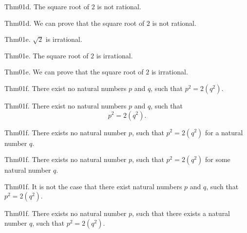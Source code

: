 \documentclass{article}
\begin{document}
Thm01d. The square root of $2$ is not rational.

Thm01d. We can prove that the square root of $2$ is not rational.

Thm01e. $\sqrt{ 2}$ is irrational.

Thm01e. The square root of $2$ is irrational.

Thm01e. We can prove that the square root of $2$ is irrational.

Thm01f. There exist no natural numbers $p$ and $q$, such that $p ^{ 2}= 2 (q ^{ 2})$.

Thm01f. There exist no natural numbers $p$ and $q$, such that $$p ^{ 2}= 2 (q ^{ 2}).$$

Thm01f. There exists no natural number $p$, such that $p ^{ 2}= 2 (q ^{ 2})$ for a natural number $q$.

Thm01f. There exists no natural number $p$, such that $p ^{ 2}= 2 (q ^{ 2})$ for some natural number $q$.

Thm01f. It is not the case that there exist natural numbers $p$ and $q$, such that $p ^{ 2}= 2 (q ^{ 2})$.

Thm01f. There exists no natural number $p$, such that there exists a natural number $q$, such that $p ^{ 2}= 2 (q ^{ 2})$.
\end{document}
